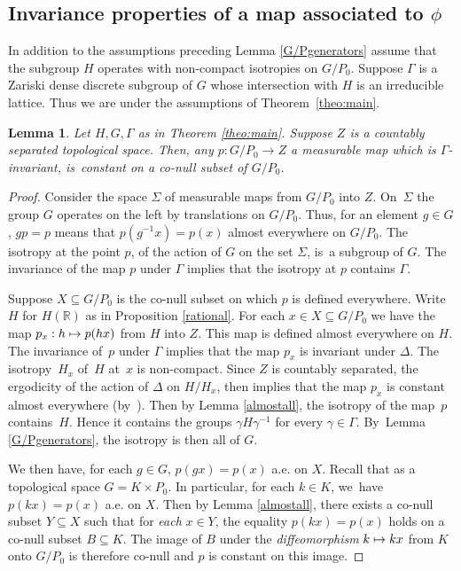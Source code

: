 \documentclass[JEP,XML,SOM,Unicode,published]{cedram}
\def\mto{\mathchoice{\longmapsto}{\mapsto}{\mapsto}{\mapsto}}
\newtheorem{lemma}{Lemma}
\theoremstyle{definition}
\newcommand{\field}[1]{\mathbb{#1}}
\newcommand{\R}{\field{R}}
\let\D\Delta
\let\g\gamma
\let\G\Gamma
\begin{document}
\subsection{Invariance properties of a map associated to $\phi$}

In addition to the assumptions preceding Lemma \ref{G/Pgenerators} assume that the subgroup $H$ operates with non-compact isotropies on $G/P_0$. Suppose $\G$ is a Zariski dense discrete subgroup of $G$ whose intersection with $H$ is an irreducible lattice. Thus we are under the assumptions of Theorem~\ref{theo:main}.

\begin{lemma} \label{constantp} Let $H,G,\Gamma$ as in Theorem \ref{theo:main}. Suppose $Z$ is a countably separated topological space. Then, any $p: G/P_0 \to Z$ a measurable map which is $\G$-invariant, is~constant on a co-null subset of $G/P_0$.
\end{lemma}

\begin{proof} Consider the space $\Sigma $ of measurable maps from $G/P_0$ into $Z$. On~$\Sigma$ the group $G$ operates on the left by translations on $G/P_0$. Thus, for an element $g\in G$, $gp=p$ means that $p(g^{-1}x)=p(x)$ almost everywhere on $G/P_0$. The isotropy at the point $p$, of the action of $G$ on the set $\Sigma $, is~a subgroup of $G$. The invariance of the map $p$ under $\G$ implies that the isotropy at $p$ contains $\G$.

Suppose $X\subseteq G/P_0$ is the co-null subset on which $p$ is defined everywhere. Write~$H$ for $H(\R)$ as in Proposition \ref{rational}. For each $x\in X\subseteq G/P_0$ we have the map \hbox{$p_x: h\mto p(hx)$} from $H$ into $Z$. This map is defined almost everywhere on $H$. The invariance of~$p$ under $\Gamma $ implies that the map $p_x$ is invariant under $\D$. The isotropy~$H_x$ of~$H$ at~$x$ is non-compact. Since $Z$ is countably separated, the ergodicity of the action of $\D$ on $H/H_x$, then implies that the map $p_x$ is constant almost everywhere (by~\cite[Prop.\,(2.1.11)]{Z}). Then by Lemma \ref{almostall}, the isotropy of the map~$p$ contains~$H$. Hence it contains the groups $\g H \g ^{-1}$ for every $\g \in \G$. By~Lemma \ref{G/Pgenerators}, the isotropy is then all of $G$.

We then have, for each $g\in G$, $p(gx)=p(x)$ a.e. on $X$. Recall that as a topological space $G=K\times P_0$. In particular, for each $k\in K$, we~have $p(kx)=p(x)$ a.e. on $X$. Then by Lemma \ref{almostall}, there exists a co-null subset $Y\subseteq X$ such that for \emph{each} $x\in Y$, the equality $p(kx)=p(x)$ holds on a co-null subset $B \subseteq K$. The image of $B$ under the \emph{diffeomorphism} $k\mto kx$ from $K$ onto $G/P_0$ is therefore co-null and $p$ is constant on this image.
\end{proof}
\end{document}
